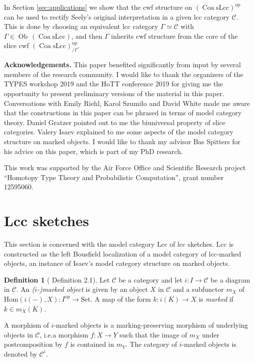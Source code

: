 \documentclass[a4paper]{article}
\theoremstyle{remark}
\theoremstyle{definition}
\newtheorem{definition}[theorem]{Definition}
\begin{document}
In Section \ref{sec:applications} we show that the cwf structure on $(\operatorname{Coa} \mathrm{sLcc})^\mathrm{op}$ can be used to rectify Seely's original interpretation in a given lcc category $\mathcal{C}$.
This is done by choosing an equivalent lcc category $\Gamma \simeq \mathcal{C}$ with $\Gamma \in \operatorname{Ob} \, (\operatorname{Coa} \mathrm{sLcc})$, and then $\Gamma$ inherits cwf structure from the core of the slice cwf $(\operatorname{Coa} \mathrm{sLcc})^\mathrm{op}_{ / \Gamma}$.

\textbf{Acknowledgements.}
This paper benefited significantly from input by several members of the research community.
I would like to thank the organizers of the TYPES workshop 2019 and the HoTT conference 2019 for giving me the opportunity to present preliminary versions of the material in this paper.
Conversations with Emily Riehl, Karol Szumiło and David White made me aware that the constructions in this paper can be phrased in terms of model category theory.
Daniel Gratzer pointed out to me the biuniversal property of slice categories.
Valery Isaev explained to me some aspects of the model category structure on marked objects.
I would like to thank my advisor Bas Spitters for his advice on this paper, which is part of my PhD research.

This work was supported by the Air Force Office and Scientific Research project ``Homotopy Type Theory and Probabilistic Computation'', grant number 12595060.

\section{Lcc sketches}
\label{sec:lcc-sketches}

This section is concerned with the model category $\mathrm{Lcc}$ of lcc sketches.
$\mathrm{Lcc}$ is constructed as the left Bousfield localization of a model category of lcc-marked objects, an instance of Isaev's model category structure on marked objects.

\begin{definition}[\citet{marked-objects} Definition 2.1]
  Let $\mathcal{C}$ be a category and let $i : I \rightarrow \mathcal{C}$ be a diagram in $\mathcal{C}$.
  An \emph{($i$-)marked object} is given by an object $X$ in $\mathcal{C}$ and a subfunctor $m_X$ of $\mathrm{Hom}(i(-), X) : I^\mathrm{op} \rightarrow \mathrm{Set}$.
  A map of the form $k : i(K) \rightarrow X$ is \emph{marked} if $k \in m_X(K)$.

  A morphism of $i$-marked objects is a marking-preserving morphism of underlying objects in $\mathcal{C}$, i.e.\@ a morphism $f : X \rightarrow Y$ such that the image of $m_X$ under postcomposition by $f$ is contained in $m_Y$.
  The category of $i$-marked objects is denoted by $\mathcal{C}^i$.
\end{definition}
\end{document}
